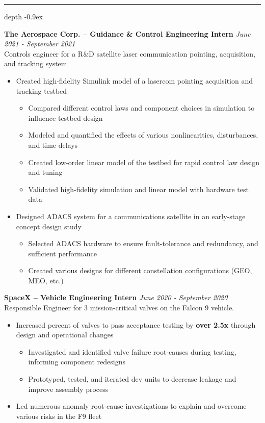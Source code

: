 \documentclass[11pt, letterpaper]{article}
\newcommand\smallspace{4pt}
\newcommand\indentlength{0.25in}
\def\Vhrulefill{\leavevmode\leaders\hrule height 1ex depth \dimexpr0.1pt-0.9ex\hfill\kern0pt}
\newenvironment{category}[1]
{
	\vspace{\smallspace}
	\noindent {\LARGE{\sc{#1}}} \hspace{2pt}
	\Vhrulefill
	\vspace{\smallspace}
	\begin{addmargin}[\indentlength]{0in}
}
{
	\end{addmargin}
	\vspace{\smallspace}
}
\newenvironment{experience}[4][3]{
	\vspace{\smallspace}
	\noindent\textbf{#2}
	\hfill \textit{#3} \\
	#4
	\vspace{\smallspace}
	\begin{itemize}
	}
	{
	\end{itemize}
	\vspace{\smallspace}
}
\begin{document}
\begin{category}{Work Experience}
\begin{experience}{The Aerospace Corp. -- Guidance \& Control Engineering Intern}{June 2021 - September 2021}{Controls engineer for a R\&D satellite laser communication pointing, acquisition, and tracking system}
	\item Created high-fidelity Simulink model of a lasercom pointing acquisition and tracking testbed
	\begin{itemize}[noitemsep,nolistsep]
		\item Compared different control laws and component choices in simulation to influence testbed design
		\item Modeled and quantified the effects of various nonlinearities, disturbances, and time delays
		\item Created low-order linear model of the testbed for rapid control law design and tuning
		\item Validated high-fidelity simulation and linear model with hardware test data
	\end{itemize}
	\item Designed ADACS system for a communications satellite  in an early-stage concept design study
	\begin{itemize}[noitemsep,nolistsep]
		\item Selected ADACS hardware to ensure fault-tolerance and redundancy, and sufficient performance
		\item Created various designs for different constellation configurations (GEO, MEO, etc.)
	\end{itemize}
\end{experience}

\begin{experience}{SpaceX -- Vehicle Engineering Intern}{June 2020 - September 2020}{Responsible Engineer for 3 mission-critical valves on the Falcon 9 vehicle.}
	\item Increased percent of valves to pass acceptance testing by \textbf{over 2.5x} through design and operational changes
	\begin{itemize}[noitemsep,nolistsep]
		\item Investigated and identified valve failure root-causes during testing, informing component redesigns
		\item Prototyped, tested, and iterated dev units to decrease leakage and improve assembly process
	\end{itemize}
	\item Led numerous anomaly root-cause investigations to explain and overcome various risks in the F9 fleet
\end{experience}


\end{category}
\end{document}
